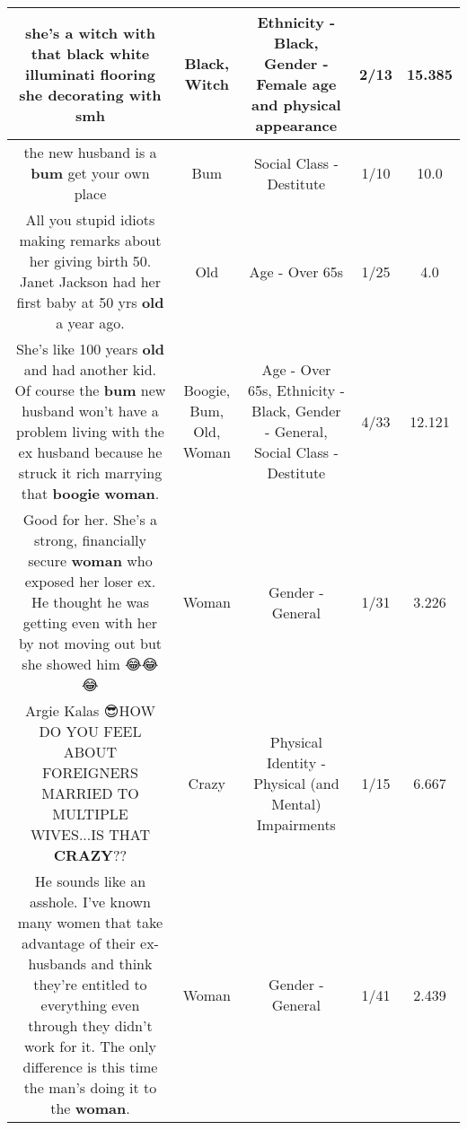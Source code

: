 \documentclass[11pt]{article}
\newlength\mylength
\begin{document}
\begin{center}
\begin{longtable}{|C{.65\mylength}|C{.30\mylength}|C{.12\mylength}|C{.12\mylength}|C{.12\mylength}|}
  \small she's a \textbf{witch} with that \textbf{black} white illuminati flooring she decorating with smh\normalsize   & Black, Witch & Ethnicity - Black, Gender - Female age and physical appearance & 2/13 & 15.385 \\  \hline
  \small the new husband is a \textbf{bum} get your own place\normalsize   & Bum & Social Class - Destitute & 1/10 & 10.0 \\  \hline
  \small All you stupid idiots making remarks about her giving birth \@ 50. Janet Jackson had her first baby at 50 yrs \textbf{old} a year ago.\normalsize   & Old & Age - Over 65s & 1/25 & 4.0 \\  \hline
  \small She's like 100 years \textbf{old} and had another kid. Of course the \textbf{bum} new husband won't have a problem living with the ex husband because he struck it rich marrying that \textbf{boogie} \textbf{woman}.\normalsize   & Boogie, Bum, Old, Woman & Age - Over 65s, Ethnicity - Black, Gender - General, Social Class - Destitute & 4/33 & 12.121 \\  \hline
  \small Good for her. She's a strong, financially secure \textbf{woman} who exposed her loser ex. He thought he was getting even with her by not moving out but she showed him 😂😂😂\normalsize   & Woman & Gender - General & 1/31 & 3.226 \\  \hline
  \small Argie Kalas 😎HOW DO YOU FEEL ABOUT FOREIGNERS  MARRIED TO MULTIPLE WIVES...IS THAT \textbf{CRAZY}??\normalsize   & Crazy & Physical Identity - Physical (and Mental) Impairments & 1/15 & 6.667 \\  \hline
  \small He sounds like an asshole. I've known many women that take advantage of their ex-husbands and think they're entitled to everything even through they didn't work for it. The only difference is this time the man's doing it to the \textbf{woman}.\normalsize   & Woman & Gender - General & 1/41 & 2.439 \\  \hline

\end{longtable}
\end{center}
\end{document}
